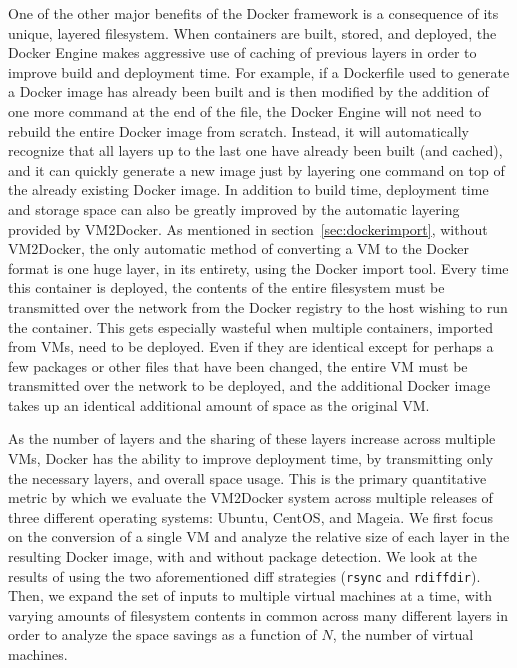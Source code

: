 One of the other major benefits of the Docker framework is a consequence of its unique, layered filesystem. When containers are built, stored, and deployed, the Docker Engine makes aggressive use of caching of previous layers in order to improve build and deployment time. For example, if a Dockerfile used to generate a Docker image has already been built and is then modified by the addition of one more command at the end of the file, the Docker Engine will not need to rebuild the entire Docker image from scratch. Instead, it will automatically recognize that all layers up to the last one have already been built (and cached), and it can quickly generate a new image just by layering one command on top of the already existing Docker image. In addition to build time, deployment time and storage space can also be greatly improved by the automatic layering provided by VM2Docker. As mentioned in section~\ref{sec:dockerimport}, without VM2Docker, the only automatic method of converting a VM to the Docker format is one huge layer, in its entirety, using the Docker import tool. Every time this container is deployed, the contents of the entire filesystem must be transmitted over the network from the Docker registry to the host wishing to run the container. This gets especially wasteful when multiple containers, imported from VMs, need to be deployed. Even if they are identical except for perhaps a few packages or other files that have been changed, the entire VM must be transmitted over the network to be deployed, and the additional Docker image takes up an identical additional amount of space as the original VM. 

As the number of layers and the sharing of these layers increase across multiple VMs, Docker has the ability to improve deployment time, by transmitting only the necessary layers, and overall space usage. This is the primary quantitative metric by which we evaluate the VM2Docker system across multiple releases of three different operating systems: Ubuntu, CentOS, and Mageia. We first focus on the conversion of a single VM and analyze the relative size of each layer in the resulting Docker image, with and without package detection. We look at the results of using the two aforementioned diff strategies (\texttt{rsync} and \texttt{rdiffdir}). Then, we expand the set of inputs to multiple virtual machines at a time, with varying amounts of filesystem contents in common across many different layers in order to analyze the space savings as a function of $N$, the number of virtual machines.


